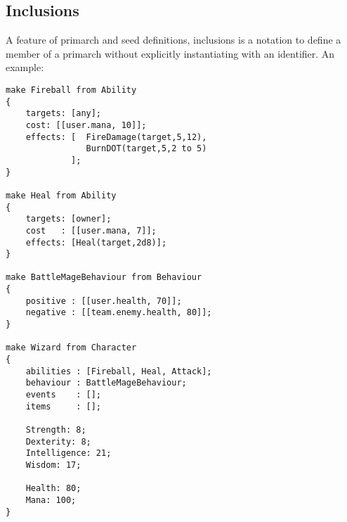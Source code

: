 
\subsection{Inclusions}
A feature of primarch and seed definitions, inclusions  is a notation to define a member of a primarch without explicitly instantiating with an identifier. An example:
\begin{lstlisting}
make Fireball from Ability
{
	targets: [any];
	cost: [[user.mana, 10]];
	effects: [	FireDamage(target,5,12),
				BurnDOT(target,5,2 to 5)
			 ];
}

make Heal from Ability
{
	targets: [owner];
	cost   : [[user.mana, 7]];
	effects: [Heal(target,2d8)];
}

make BattleMageBehaviour from Behaviour
{
	positive : [[user.health, 70]];
	negative : [[team.enemy.health, 80]];
}

make Wizard from Character
{
	abilities : [Fireball, Heal, Attack];
	behaviour : BattleMageBehaviour;
	events    : [];
	items     : [];
                 
    Strength: 8;
    Dexterity: 8;
    Intelligence: 21;
    Wisdom: 17;
    
    Health: 80;
    Mana: 100;
}
\end{lstlisting}

